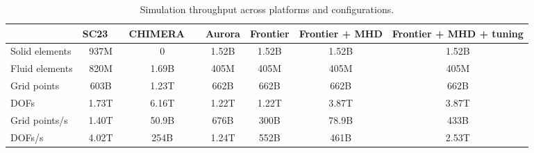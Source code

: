 \begin{table}
\footnotesize
\setlength{\tabcolsep}{4pt}
\renewcommand{\arraystretch}{1.1}
\centering
\begin{tabular}{|l|c|c|c|c|c|c|}
\hline
& \textbf{SC23}~~\cite{sc23} & \textbf{CHIMERA}~~\cite{sc24} & \textbf{Aurora} & \textbf{Frontier} & \textbf{Frontier + MHD} & \textbf{Frontier + MHD + tuning} \\
\hline
Solid elements    & 937M  & 0     & 1.52B & 1.52B & 1.52B & 1.52B \\
Fluid elements    & 820M  & 1.69B & 405M  & 405M  & 405M  & 405M \\
Grid points       & 603B  & 1.23T & 662B  & 662B  & 662B  & 662B \\
DOFs              & 1.73T & 6.16T & 1.22T & 1.22T & 3.87T & 3.87T \\
Grid points/s     & 1.40T & 50.9B & 676B  & 300B  & 78.9B & 433B \\
DOFs/s            & 4.02T & 254B  & 1.24T & 552B  & 461B  & 2.53T \\
\hline
\end{tabular}
\caption{Simulation throughput across platforms and configurations.}
\label{tab:simulation_metrics}
\end{table}


